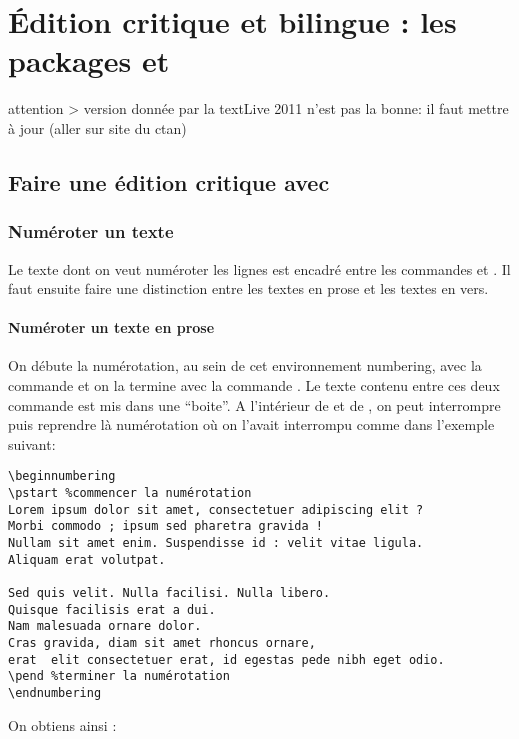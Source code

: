 \chapter{Édition critique et bilingue : les packages  et }
\label{ledmac}


attention > version donnée par la textLive 2011 n'est pas la bonne: il faut mettre à jour  (aller sur site du ctan)

\section{Faire une édition critique avec }

\subsection{Numéroter un texte}

Le texte dont on veut numéroter les lignes est encadré entre les commandes  et . Il faut ensuite faire une distinction entre les textes en prose et les textes en vers. 

\subsubsection{Numéroter un texte en prose}

On débute la numérotation, au sein de cet environnement numbering, avec la commande  et on la termine avec la commande . Le texte contenu entre ces deux commande est mis dans une \enquote{boite}. A l'intérieur de  et de ,  on peut interrompre puis reprendre là numérotation où on l'avait interrompu comme dans l'exemple suivant:

\begin{verbatim}
\beginnumbering
\pstart %commencer la numérotation
Lorem ipsum dolor sit amet, consectetuer adipiscing elit ?
Morbi commodo ; ipsum sed pharetra gravida !
Nullam sit amet enim. Suspendisse id : velit vitae ligula.
Aliquam erat volutpat.

Sed quis velit. Nulla facilisi. Nulla libero. 
Quisque facilisis erat a dui. 
Nam malesuada ornare dolor.
Cras gravida, diam sit amet rhoncus ornare, 
erat  elit consectetuer erat, id egestas pede nibh eget odio.
\pend %terminer la numérotation
\endnumbering
\end{verbatim}

On obtiens ainsi : 

